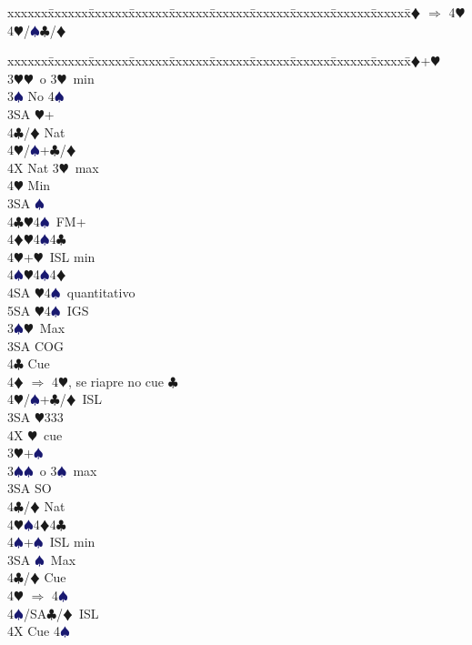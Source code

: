 \documentclass[a4paper,italian]{article}
\newcommand{\BC}{\textcolor{OliveGreen}{$\clubsuit$}}
\newcommand{\BD}{\textcolor{RedOrange}{$\vardiamondsuit$}}
\newcommand{\BH}{\textcolor{Red2}{$\varheartsuit${}}}
\newcommand{\BS}{\textcolor{MidnightBlue}{$\spadesuit${}}}
\newenvironment{bidtable}
{\begin{tabbing}

    xxxxxx\=xxxxxx\=xxxxxx\=xxxxxx\=xxxxxx\=xxxxxx\=xxxxxx\=xxxxxx\=xxxxxx\=xxxxxx\=\kill}
{\end{tabbing} }%
\begin{document}
\begin{multicols}{2}
\begin{bidtable}
        4\BD \> $\Rightarrow$ 4\BH \\
        4\BH/\BS {}\BC /\BD \-\-\\
    \end{bidtable}
    \columnbreak
    \begin{bidtable}
        3\BD {}+\BH \+\\
        3\BH {}\BH\ o 3\BH\ min\+\\
        3\BS \> No 4\BS \+\\
        3SA \BH +\+\\
        4\BC/\BD \> Nat\\
        4\BH/\BS {}+\BC /\BD \-\\
        4X \> Nat 3\BH\ max\\
        4\BH \> Min\-\\
        3SA \BS \\
        4\BC {}\BH 4\BS\ FM+\\
        4\BD {}\BH 4\BS 4\BC \\
        4\BH {}+\BH\ ISL min\\
        4\BS {}\BH 4\BS 4\BD \\
        4SA \BH 4\BS\ quantitativo\\
        5SA \BH 4\BS\ IGS\-\\
        3\BS {}\BH\ Max\+\\
        3SA\> COG\\
        4\BC\> Cue\\
        4\BD\> $\Rightarrow$ 4\BH, se riapre no cue \BC\\
        4\BH/\BS{}+\BC/\BD\ ISL\-\\
        3SA \BH 333\\
        4X \BH\ cue\-\\
        3\BH {}+\BS \+\\
        3\BS {}\BS\ o 3\BS\ max\+\\
        3SA \> SO\\
        4\BC/\BD \> Nat\\
        4\BH {}\BS 4\BD 4\BC \\
        4\BS {}+\BS\ ISL min\-\\
        3SA \BS\ Max\+\\
        4\BC/\BD\> Cue\\
        4\BH\> $\Rightarrow$ 4\BS\\
        4\BS/SA\BC/\BD\ ISL\-\\
        4X \> Cue 4\BS\\
    \end{bidtable}
\end{multicols}
\end{document}
